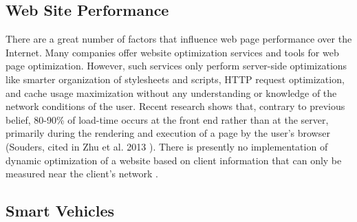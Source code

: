 \documentclass{article}
\begin{document}
\subsection{Web Site Performance}
There are a great number of factors that influence web page performance over the Internet. Many companies offer website optimization services and tools for web page optimization. However, such services only perform server-side optimizations like smarter organization of stylesheets and scripts, HTTP request optimization, and cache usage maximization without any understanding or knowledge of the network conditions of the user. Recent research shows that, contrary to previous belief, 80-90\% of load-time occurs at the front end rather than at the server, primarily during the rendering and execution of a page by the user's browser (Souders, cited in Zhu et al. 2013 \cite{zhu2013improving}). There is presently no implementation of dynamic optimization of a website based on client information that can only be measured near the client's network \cite{zhu2013improving}.

\subsection{Smart Vehicles}

\pagebreak

\renewcommand{\refname}{\section{References}}


\end{document}
